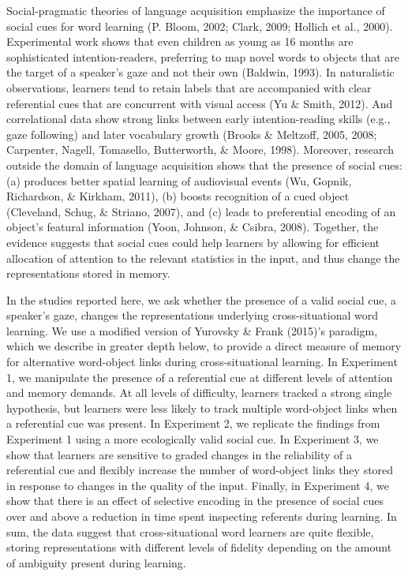 \documentclass[authoryear, review]{elsarticle}
\begin{document}
Social-pragmatic theories of language acquisition emphasize the
importance of social cues for word learning (P. Bloom, 2002; Clark,
2009; Hollich et al., 2000). Experimental work shows that even children
as young as 16 months are sophisticated intention-readers, preferring to
map novel words to objects that are the target of a speaker's gaze and
not their own (Baldwin, 1993). In naturalistic observations, learners
tend to retain labels that are accompanied with clear referential cues
that are concurrent with visual access (Yu \& Smith, 2012). And
correlational data show strong links between early intention-reading
skills (e.g., gaze following) and later vocabulary growth (Brooks \&
Meltzoff, 2005, 2008; Carpenter, Nagell, Tomasello, Butterworth, \&
Moore, 1998). Moreover, research outside the domain of language
acquisition shows that the presence of social cues: (a) produces better
spatial learning of audiovisual events (Wu, Gopnik, Richardson, \&
Kirkham, 2011), (b) boosts recognition of a cued object (Cleveland,
Schug, \& Striano, 2007), and (c) leads to preferential encoding of an
object's featural information (Yoon, Johnson, \& Csibra, 2008).
Together, the evidence suggests that social cues could help learners by
allowing for efficient allocation of attention to the relevant
statistics in the input, and thus change the representations stored in
memory.

In the studies reported here, we ask whether the presence of a valid
social cue, a speaker's gaze, changes the representations underlying
cross-situational word learning. We use a modified version of Yurovsky
\& Frank (2015)'s paradigm, which we describe in greater depth below, to
provide a direct measure of memory for alternative word-object links
during cross-situational learning. In Experiment 1, we manipulate the
presence of a referential cue at different levels of attention and
memory demands. At all levels of difficulty, learners tracked a strong
single hypothesis, but learners were less likely to track multiple
word-object links when a referential cue was present. In Experiment 2,
we replicate the findings from Experiment 1 using a more ecologically
valid social cue. In Experiment 3, we show that learners are sensitive
to graded changes in the reliability of a referential cue and flexibly
increase the number of word-object links they stored in response to
changes in the quality of the input. Finally, in Experiment 4, we show
that there is an effect of selective encoding in the presence of social
cues over and above a reduction in time spent inspecting referents
during learning. In sum, the data suggest that cross-situational word
learners are quite flexible, storing representations with different
levels of fidelity depending on the amount of ambiguity present during
learning.
\end{document}
